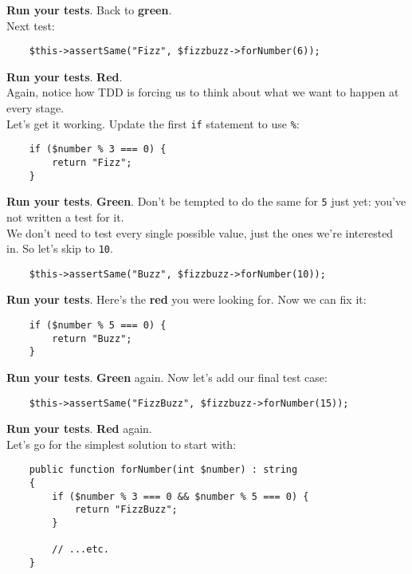 \textbf{Run your tests}. Back to \textbf{green}.
\\

Next test:

\begin{verbatim}
    $this->assertSame("Fizz", $fizzbuzz->forNumber(6));
\end{verbatim}

\textbf{Run your tests}. \textbf{Red}.
\\

Again, notice how TDD is forcing us to think about what we want to happen at every stage.
\\

Let's get it working. Update the first \texttt{if} statement to use \texttt{\%}:

\begin{verbatim}
    if ($number % 3 === 0) {
        return "Fizz";
    }
\end{verbatim}

\textbf{Run your tests}. \textbf{Green}. Don't be tempted to do the same for \texttt{5} just yet: you've not written a test for it.
\\

We don't need to test every single possible value, just the ones we're interested in. So let's skip to \texttt{10}.

\begin{verbatim}
    $this->assertSame("Buzz", $fizzbuzz->forNumber(10));
\end{verbatim}

\textbf{Run your tests}. Here's the \textbf{red} you were looking for. Now we can fix it:

\begin{verbatim}
    if ($number % 5 === 0) {
        return "Buzz";
    }
\end{verbatim}

\textbf{Run your tests}. \textbf{Green} again. Now let's add our final test case:

\begin{verbatim}
    $this->assertSame("FizzBuzz", $fizzbuzz->forNumber(15));
\end{verbatim}

\textbf{Run your tests}. \textbf{Red} again.
\\

Let's go for the simplest solution to start with:

\begin{verbatim}
    public function forNumber(int $number) : string
    {
        if ($number % 3 === 0 && $number % 5 === 0) {
            return "FizzBuzz";
        }

        // ...etc.
    }
\end{verbatim}

